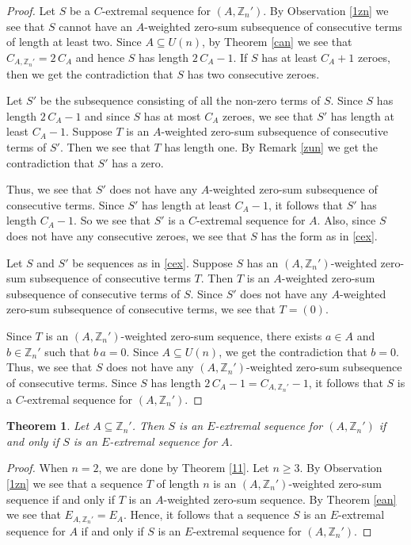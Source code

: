 \documentclass{article}[11pt]
\newtheorem{theorem}{Theorem}[section]
\theoremstyle{definition}
\begin{document}
\begin{proof}
Let $S$ be a $C$-extremal sequence for $(A,\mathbb Z_n')$. By Observation \ref{1zn} we see that $S$ cannot have an $A$-weighted zero-sum subsequence of consecutive terms of length at least two. Since $A\subseteq U(n)$, by Theorem \ref{can} we see that $C_{A,\mathbb Z_n'}=2\,C_A$ and hence $S$ has length $2\,C_A-1$. If $S$ has at least $C_A+1$ zeroes, then we get the contradiction that $S$ has two consecutive zeroes.

Let $S'$ be the subsequence consisting of all the non-zero terms of $S$. Since $S$ has length $2\,C_A-1$ and since $S$ has at most $C_A$ zeroes, we see that $S'$ has length at least $C_A-1$. Suppose $T$ is an $A$-weighted zero-sum subsequence of consecutive terms of $S'$. Then we see that $T$ has length one. By Remark \ref{zun} we get the contradiction that $S'$ has a zero.

Thus, we see that $S'$ does not have any $A$-weighted zero-sum subsequence of consecutive terms. Since $S'$ has length at least $C_A-1$, it follows that $S'$ has length $C_A-1$. So we see that $S'$ is a $C$-extremal sequence for $A$. Also, since $S$ does not have any consecutive zeroes, we see that $S$ has the form as in \eqref{cex}.

Let $S$ and $S'$ be sequences as in \eqref{cex}. Suppose $S$ has an $(A,\mathbb Z_n')$-weighted zero-sum subsequence of consecutive terms $T$. Then $T$ is an $A$-weighted zero-sum subsequence of consecutive terms of $S$. Since $S'$ does not have any $A$-weighted zero-sum subsequence of consecutive terms, we see that $T=(0)$.

Since $T$ is an $(A,\mathbb Z_n')$-weighted zero-sum sequence, there exists $a\in A$ and $b\in \mathbb Z_n'$ such that $b\,a=0$. Since $A\subseteq U(n)$, we get the contradiction that $b=0$. Thus, we see that $S$ does not have any $(A,\mathbb Z_n')$-weighted zero-sum subsequence of consecutive terms. Since $S$ has length $2\,C_A-1=C_{A,\mathbb Z_n'}-1$, it follows that $S$ is a $C$-extremal sequence for $(A,\mathbb Z_n')$.
\end{proof}


\begin{theorem}\label{en'}
Let $A\subseteq \mathbb Z_n'$. Then $S$ is an $E$-extremal sequence for $(A,\mathbb Z_n')$ if and only if $S$ is an $E$-extremal sequence for $A$.
\end{theorem}

\begin{proof}
When $n=2$, we are done by Theorem \ref{11}. Let $n\geq 3$. By Observation \ref{1zn} we see that a sequence $T$ of length $n$ is an $(A,\mathbb Z_n')$-weighted zero-sum sequence if and only if $T$ is an $A$-weighted zero-sum sequence. By Theorem \ref{ean} we see that $E_{A,\mathbb Z_n'}=E_A$. Hence, it follows that a sequence $S$ is an $E$-extremal sequence for $A$ if and only if $S$ is an $E$-extremal sequence for $(A,\mathbb Z_n')$.
\end{proof}
\end{document}
